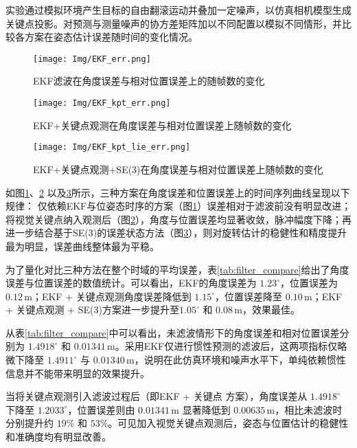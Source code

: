 实验通过模拟环境产生目标的自由翻滚运动并叠加一定噪声，以仿真相机模型生成关键点投影。对预测与测量噪声的协方差矩阵加以不同配置以模拟不同情形，并比较各方案在姿态估计误差随时间的变化情况。

\begin{figure}[htbp]
	\centering
	\texttt{[image: Img/EKF\_err.png]}
	\caption{EKF滤波在角度误差与相对位置误差上的随帧数的变化}
	\label{fig:PoseErrorComparison_EKF}
\end{figure}

\begin{figure}[htbp]
	\centering
	\texttt{[image: Img/EKF\_kpt\_err.png]}
	\caption{EKF+关键点观测在角度误差与相对位置误差上随帧数的变化}
	\label{fig:PoseErrorComparison_KPT}
\end{figure}

\begin{figure}[htbp]
	\centering
	\texttt{[image: Img/EKF\_kpt\_lie\_err.png]}
	\caption{EKF+关键点观测+SE(3)在角度误差与相对位置误差上随帧数的变化}
	\label{fig:PoseErrorComparison_LIE}
\end{figure}

如图\ref{fig:PoseErrorComparison_EKF}、\ref{fig:PoseErrorComparison_KPT} 以及\ref{fig:PoseErrorComparison_LIE}所示，三种方案在角度误差和位置误差上的时间序列曲线呈现以下规律：
仅依赖EKF与位姿态时序的方案（图\ref{fig:PoseErrorComparison_EKF}）误差相对于滤波前没有明显改进；将视觉关键点纳入观测后（图\ref{fig:PoseErrorComparison_KPT}），角度与位置误差均显著收敛，脉冲幅度下降；再进一步结合基于SE(3)的误差状态方法（图\ref{fig:PoseErrorComparison_LIE}），则对旋转估计的稳健性和精度提升最为明显，误差曲线整体最为平稳。


为了量化对比三种方法在整个时域的平均误差，表\ref{tab:filter_compare}给出了角度误差与位置误差的数值统计。可以看出，EKF的角度误差为 $1.23^\circ$，位置误差为 $0.12\,\mathrm{m}$；EKF + 关键点观测角度误差降低到 $1.15^\circ$，位置误差降至 $0.10\,\mathrm{m}$；EKF + 关键点观测 + SE(3)方案进一步提升至$1.05^\circ$ 和 $0.08\,\mathrm{m}$，效果最佳。






从表\ref{tab:filter_compare}中可以看出，未滤波情形下的角度误差和相对位置误差分别为 \(1.4918^\circ\) 和 \(0.01341\,\mathrm{m}\)。采用EKF仅进行惯性预测的滤波后，这两项指标仅略微下降至 \(1.4911^\circ\) 与 \(0.01340\,\mathrm{m}\)，说明在此仿真环境和噪声水平下，单纯依赖惯性信息并不能带来明显的效果提升。

当将关键点观测引入滤波过程后（即EKF + 关键点 方案），角度误差从 \(1.4918^\circ\) 下降至 \(1.2033^\circ\)，位置误差则由 \(0.01341\,\mathrm{m}\) 显著降低到 \(0.00635\,\mathrm{m}\)，相比未滤波时分别提升约 \(19\%\) 和 \(53\%\)。可见加入视觉关键点观测后，姿态与位置估计的稳健性和准确度均有明显改善。

